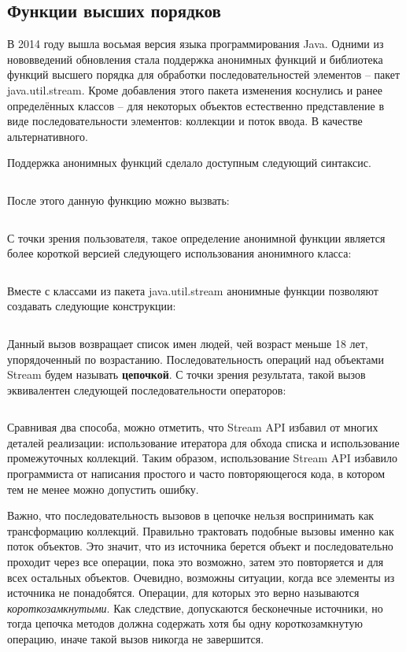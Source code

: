 \subsection{Функции высших порядков} \label{ho-functions}
В 2014 году вышла восьмая версия языка программирования Java. Одними из нововведений обновления 
стала поддержка анонимных функций и библиотека функций высшего порядка для обработки 
последовательностей элементов -- пакет java.util.stream. Кроме добавления этого пакета 
изменения коснулись и ранее определённых классов -- для некоторых объектов естественно 
представление в виде последовательности элементов: коллекции и поток ввода. В качестве альтернативного.

Поддержка анонимных функций сделало доступным следующий синтаксис.
\inputminted{java}{chapter1/code/Lambda.java}

После этого данную функцию можно вызвать:
\inputminted{java}{chapter1/code/UseLambda.java}

С точки зрения пользователя, такое определение анонимной функции является более короткой версией следующего использования анонимного класса:

\inputminted{java}{chapter1/code/SameAnonymous.java}

Вместе с классами из пакета java.util.stream анонимные функции позволяют создавать следующие конструкции:

\inputminted{java}{chapter1/code/StreamUsage.java}

Данный вызов возвращает список имен людей, чей возраст меньше 18 лет, упорядоченный по возрастанию.
Последовательность операций над объектами Stream будем называть \textbf{цепочкой}.
С точки зрения результата, такой вызов эквивалентен следующей последовательности операторов: 

\inputminted{java}{chapter1/code/CyclesUsage.java}

Сравнивая два способа, можно отметить, что Stream API избавил от многих деталей реализации: использование итератора для обхода списка и использование промежуточных коллекций. Таким образом, использование Stream API избавило программиста от написания простого и часто повторяющегося кода, в котором тем не менее можно допустить ошибку.

Важно, что последовательность вызовов в цепочке нельзя воспринимать как трансформацию коллекций. Правильно трактовать подобные вызовы именно как поток объектов. Это значит, что из источника берется объект и последовательно проходит через все операции, пока это возможно, затем это повторяется и для всех остальных объектов. Очевидно, возможны ситуации, когда все элементы из источника не понадобятся. Операции, для которых это верно называются \textit{короткозамкнутыми}. Как следствие, допускаются бесконечные источники, но тогда цепочка методов должна содержать хотя бы одну короткозамкнутую операцию, иначе такой вызов никогда не завершится.


